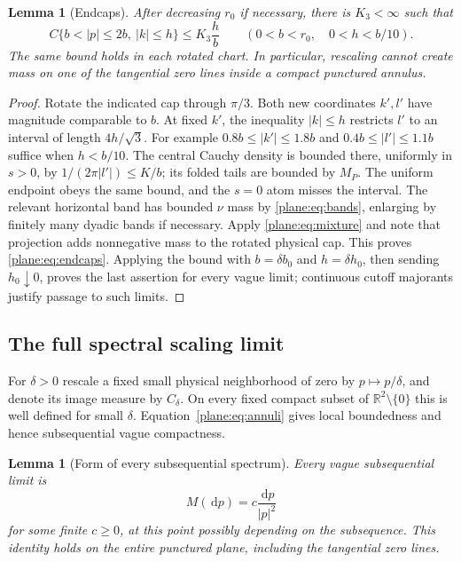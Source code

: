 \documentclass[11pt]{article}
\newtheorem{lemma}[theorem]{Lemma}
\theoremstyle{definition}
\theoremstyle{remark}
\numberwithin{equation}{section}
\begin{document}
\begin{lemma}[Endcaps]
\label{lem:endcaps}
After decreasing $r_0$ if necessary, there is $K_3<\infty$ such that
\begin{equation}
 \label{plane:eq:endcaps}
 C\{b<|p|\le2b,\ |k|\le h\}\le K_3\frac hb
 \qquad(0<b<r_0,\quad0<h<b/10).
\end{equation}
The same bound holds in each rotated chart.  In particular, rescaling
cannot create mass on one of the tangential zero lines inside a compact
punctured annulus.
\end{lemma}

\begin{proof}
Rotate the indicated cap through $\pi/3$.  Both new coordinates $k',l'$
have magnitude comparable to $b$.  At fixed $k'$, the inequality
$|k|\le h$ restricts $l'$ to an interval of length $4h/\sqrt3$.
For example $0.8b\le|k'|\le1.8b$ and
$0.4b\le|l'|\le1.1b$ suffice when $h<b/10$.
The central Cauchy density is bounded there, uniformly in $s>0$, by
$1/(2\pi|l'|)\le K/b$; its folded tails are bounded by $M_P$.
The uniform endpoint obeys the same bound, and the $s=0$ atom misses
the interval.  The relevant horizontal band has bounded $\nu$ mass
by \eqref{plane:eq:bands}, enlarging by finitely many dyadic bands
if necessary.  Apply \eqref{plane:eq:mixture} and note that projection
adds nonnegative mass to the rotated physical cap.  This proves
\eqref{plane:eq:endcaps}.  Applying the bound with $b=\delta b_0$
and $h=\delta h_0$, then sending $h_0\downarrow0$, proves the last
assertion for every vague limit; continuous cutoff majorants justify
passage to such limits.
\end{proof}

\subsection{The full spectral scaling limit}

For $\delta>0$ rescale a fixed small physical neighborhood of zero by
$p\mapsto p/\delta$, and denote its image measure by $C_\delta$.
On every fixed compact subset of $\mathbb R^2\setminus\{0\}$ this is
well defined for small $\delta$.  Equation~\eqref{plane:eq:annuli}
gives local boundedness and hence subsequential vague compactness.

\begin{lemma}[Form of every subsequential spectrum]
\label{plane:lem:subsequences}
Every vague subsequential limit is
\begin{equation}
 \label{plane:eq:subsequence}
 M(\,\mathrm d p)=c\frac{\,\mathrm d p}{|p|^2}
\end{equation}
for some finite $c\ge0$, at this point possibly depending on the
subsequence.  This identity holds on the entire punctured plane,
including the tangential zero lines.
\end{lemma}
\end{document}
